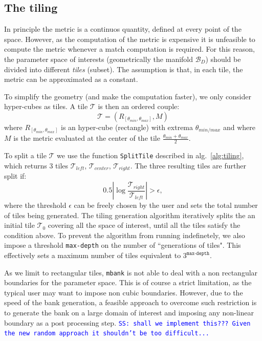 \documentclass[twocolumn,showpacs,preprintnumbers,nofootinbib,prd,
superscriptaddress,10pt]{revtex4-2}
\newcommand{\mbank}{\texttt{mbank} }
\newcommand{\stefano}[1]{{\textcolor{blue}{\texttt{SS: #1}} }}
\begin{document}
\subsection{The tiling} \label{sec:tiling}

In principle the metric is a continuos quantity, defined at every point of the space. However, as the computation of the metric is expensive it is unfeasible to compute the metric whenever a match computation is required.
For this reason, the parameter space of interests (geometrically the manifold $\mathcal{B}_D$) should be divided into different {\it tiles} (subset). The assumption is that, in each tile, the metric can be approximated as a constant.

To simplify the geometry (and make the computation faster), we only consider hyper-cubes as tiles. A tile $\mathcal{T}$ is then an ordered couple:
\begin{equation} \label{eq:tile}
	\mathcal{T} = \left(R_{[\theta_{min}, \theta_{max}]}, M \right)
\end{equation}
where $R_{[\theta_{min}, \theta_{max}]}$ is an hyper-cube (rectangle) with extrema $\theta_{min/max}$ and where $M$ is the metric evaluated at the center of the tile $\frac{\theta_{min}+\theta_{max}}{2}$.

To split a tile $\mathcal{T}$ we use the function \texttt{SplitTile} described in alg.~\ref{alg:tiling}, which returns 3 tiles $\mathcal{T}_{left}$, $\mathcal{T}_{center}$, $\mathcal{T}_{right}$.
The three resulting tiles are further split if:
\begin{equation}
	0.5\left|\log\frac{\mathcal{T}_{right}}{\mathcal{T}_{left}}\right| > \epsilon,
\end{equation}
where the threshold $\epsilon$ can be freely chosen by the user and sets the total number of tiles being generated.
The tiling generation algorithm iteratively splits the an initial tile $\mathcal{T}_{0}$ covering all the space of interest, until all the tiles satisfy the condition above.
To prevent the algorithm from running indefinetely, we also impose a threshold \texttt{max-depth} on the number of ``generations of tiles". This effectively sets a maximum number of tiles equivalent to $3^{\texttt{max-depth}}$.

As we limit to rectangular tiles, \mbank is not able to deal with a non rectangular boundaries for the parameter space. This is of course a strict limitation, as the typical user may want to impose non cubic boundaries. However, due to the speed of the bank generation, a feasible approach to overcome such restriction is to generate the bank on a large domain of interest and imposing any non-linear boundary as a post processing step. \stefano{shall we implement this??? Given the new random approach it shouldn't be too difficult...}
\end{document}
